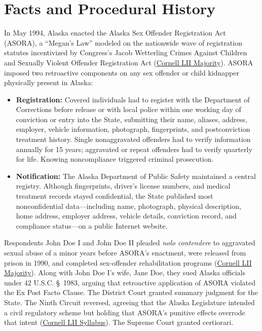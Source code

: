 \documentclass[12pt]{article}
\begin{document}
\section{Facts and Procedural History}
In May 1994, Alaska enacted the Alaska Sex Offender Registration Act (ASORA), a ``Megan's Law'' modeled on the nationwide wave of registration statutes incentivized by Congress's Jacob Wetterling Crimes Against Children and Sexually Violent Offender Registration Act (\href{https://www.law.cornell.edu/supct/html/01-729.ZO.html}{Cornell LII Majority}). ASORA imposed two retroactive components on any sex offender or child kidnapper physically present in Alaska:
\begin{itemize}
  \item \textbf{Registration:} Covered individuals had to register with the Department of Corrections before release or with local police within one working day of conviction or entry into the State, submitting their name, aliases, address, employer, vehicle information, photograph, fingerprints, and postconviction treatment history. Single nonaggravated offenders had to verify information annually for 15 years; aggravated or repeat offenders had to verify quarterly for life. Knowing noncompliance triggered criminal prosecution.
  \item \textbf{Notification:} The Alaska Department of Public Safety maintained a central registry. Although fingerprints, driver's license numbers, and medical treatment records stayed confidential, the State published most nonconfidential data---including name, photograph, physical description, home address, employer address, vehicle details, conviction record, and compliance status---on a public Internet website.
\end{itemize}

Respondents John Doe I and John Doe II pleaded \textit{nolo contendere} to aggravated sexual abuse of a minor years before ASORA's enactment, were released from prison in 1990, and completed sex-offender rehabilitation programs (\href{https://www.law.cornell.edu/supct/html/01-729.ZO.html}{Cornell LII Majority}). Along with John Doe I's wife, Jane Doe, they sued Alaska officials under 42 U.S.C. \S\ 1983, arguing that retroactive application of ASORA violated the Ex Post Facto Clause. The District Court granted summary judgment for the State. The Ninth Circuit reversed, agreeing that the Alaska Legislature intended a civil regulatory scheme but holding that ASORA's punitive effects overrode that intent (\href{https://www.law.cornell.edu/supct/html/01-729.ZS.html}{Cornell LII Syllabus}). The Supreme Court granted certiorari.
\end{document}
